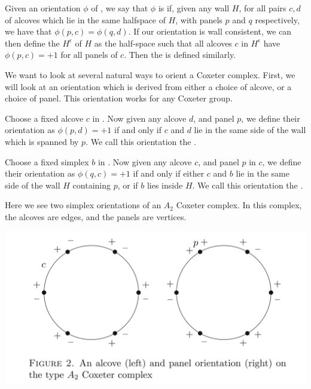 \documentclass[11pt]{article}
\begin{document}
\begin{definition}
    Given an orientation $\phi$ of \sg, we say that $\phi$ is  if, given any wall $H$, for all pairs $c,d$ of alcoves which lie in the same halfspace of $H$, with panels $p$ and $q$ respectively, we have that $\phi(p,c)=\phi(q,d)$. If our orientation is wall consistent, we can then define the  $H^{\epsilon}$ of $H$ as the half-space such that all alcoves $c$ in $H^{\epsilon}$ have $\phi(p,c)=+1$ for all panels of $c$. Then the  is defined similarly.
\end{definition}

We want to look at several natural ways to orient a Coxeter complex. First, we will look at an orientation which is derived from either a choice of alcove, or a choice of panel. This orientation works for any Coxeter group.

\begin{definition}
    Choose a fixed alcove $c$ in \sg. Now given any alcove $d$, and panel $p$, we define their orientation as $\phi(p,d)=+1$ if and only if $c$ and $d$ lie in the same side of the wall which is spanned by $p$. We call this orientation the .
\end{definition}


\begin{definition}
    Choose a fixed simplex $b$ in \sg. Now given any alcove $c$, and panel $p$ in $c$, we define their orientation as $\phi(q,c)=+1$ if and only if either $c$ and $b$ lie in the same side of the wall $H$ containing $p$, or if $b$ lies inside $H$. We call this orientation the .
\end{definition}
\begin{example}
    Here we see two simplex orientations of an $A_2$ Coxeter complex. In this complex, the alcoves are edges, and the panels are vertices.
\end{example}
\includegraphics[scale=0.6]{Screenshot 2023-02-03 102201.png}\\
\end{document}
